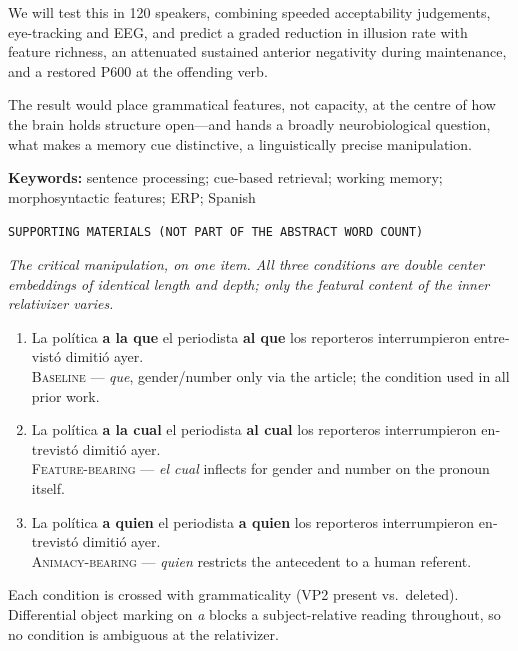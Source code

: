 \documentclass[11pt,a4paper]{article}
\newcommand{\es}[1]{\foreignlanguage{spanish}{\textit{#1}}}
\newcommand{\rel}[1]{\textbf{#1}}
\newcommand{\smallcapshead}[1]{{\color{accent}\small\texttt{\MakeUppercase{#1}}}\par\vspace{2pt}{\color{muted}\hrule}\vspace{8pt}}
\begin{document}
We will test this in 120 speakers, combining speeded acceptability judgements, eye-tracking and EEG, and predict a graded reduction in illusion rate with feature richness, an attenuated sustained anterior negativity during maintenance, and a restored P600 at the offending verb.

The result would place grammatical features, not capacity, at the centre of how the brain holds structure open---and hands a broadly neurobiological question, what makes a memory cue distinctive, a linguistically precise manipulation.

\vspace{6pt}
\textbf{Keywords:} sentence processing; cue-based retrieval; working memory; morphosyntactic features; ERP; Spanish

\vspace{14pt}
\smallcapshead{Supporting materials (not part of the abstract word count)}

\textit{The critical manipulation, on one item. All three conditions are double center embeddings of identical length and depth; only the featural content of the inner relativizer varies.}

\begin{enumerate}[label=(\alph*),leftmargin=2.2em,itemsep=0.6em]
  \item \foreignlanguage{spanish}{La política \rel{a la que} el periodista \rel{al que} los reporteros interrumpieron entrevistó dimitió ayer.}\\
  {\color{muted}\small\textsc{Baseline} --- \es{que}, gender/number only via the article; the condition used in all prior work.}
  \item \foreignlanguage{spanish}{La política \rel{a la cual} el periodista \rel{al cual} los reporteros interrumpieron entrevistó dimitió ayer.}\\
  {\color{muted}\small\textsc{Feature-bearing} --- \es{el cual} inflects for gender and number on the pronoun itself.}
  \item \foreignlanguage{spanish}{La política \rel{a quien} el periodista \rel{a quien} los reporteros interrumpieron entrevistó dimitió ayer.}\\
  {\color{muted}\small\textsc{Animacy-bearing} --- \es{quien} restricts the antecedent to a human referent.}
\end{enumerate}

{\small Each condition is crossed with grammaticality (VP2 present vs.\ deleted). Differential object marking on \es{a} blocks a subject-relative reading throughout, so no condition is ambiguous at the relativizer.\par}
\end{document}
